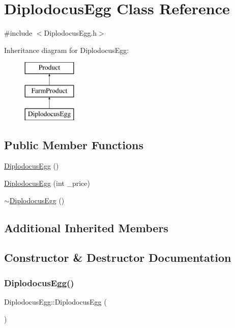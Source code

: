 \hypertarget{classDiplodocusEgg}{}\section{Diplodocus\+Egg Class Reference}
\label{classDiplodocusEgg}


{\ttfamily \#include $<$Diplodocus\+Egg.\+h$>$}

Inheritance diagram for Diplodocus\+Egg\+:\begin{figure}[H]
\begin{center}
\leavevmode
\includegraphics[height=3.000000cm]{classDiplodocusEgg}
\end{center}
\end{figure}
\subsection*{Public Member Functions}
\begin{DoxyCompactItemize}
\item 
\mbox{\hyperlink{classDiplodocusEgg_a477571ae2383956e552e85b5abe757ba}{Diplodocus\+Egg}} ()
\item 
\mbox{\hyperlink{classDiplodocusEgg_a8ce0b60b35099e28c9a6e9cfce1e02ff}{Diplodocus\+Egg}} (int \+\_\+price)
\item 
\mbox{\hyperlink{classDiplodocusEgg_a02b056492f5688bca873b734c0e9fc15}{$\sim$\+Diplodocus\+Egg}} ()
\end{DoxyCompactItemize}
\subsection*{Additional Inherited Members}


\subsection{Constructor \& Destructor Documentation}
\mbox{\label{classDiplodocusEgg_a477571ae2383956e552e85b5abe757ba}} 
\subsubsection{\texorpdfstring{DiplodocusEgg()}{DiplodocusEgg()}\hspace{0.1cm}{\footnotesize\ttfamily [1/2]}}
{\footnotesize\ttfamily Diplodocus\+Egg\+::\+Diplodocus\+Egg (\begin{DoxyParamCaption}{ }\end{DoxyParamCaption})}

